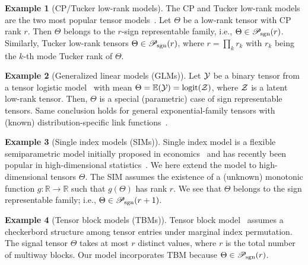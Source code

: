 \documentclass{article}
\theoremstyle{plain}
\theoremstyle{definition}
\newtheorem{example}{Example}
\def\caliP{\mathscr{P}_{\textup{sgn}}}
\begin{document}
\begin{example}[CP/Tucker low-rank models] The CP and Tucker low-rank models are the two most popular tensor models~\cite{anandkumar2014tensor,montanari2018spectral,kadmon2018statistical,cai2019nonconvex}. Let $\Theta$ be a low-rank tensor with CP rank $r$. Then $\Theta$ belongs to the $r$-sign representable family, i.e., $\Theta\in\caliP(r)$. Similarly, Tucker low-rank tensors $\Theta\in\caliP(r)$, where $r=\prod_kr_k$ with $r_k$ being the $k$-th mode Tucker rank of $\Theta$.  
\end{example} 

\begin{example}[Generalized linear models (GLMs)] Let $\mathcal{Y}$ be a binary tensor from a tensor logistic model~\cite{wang2018learning} with mean $\Theta=\mathbb{E}(\mathcal{Y})=\text{logit}(\mathcal{Z})$, where $\mathcal{Z}$ is a latent low-rank tensor. Then, $\Theta$ is a special (parametric) case of sign representable tensors. Same conclusion holds for general exponential-family tensors with (known) distribution-specific link functions~\cite{hong2020generalized}.
\end{example}

\begin{example}[Single index models (SIMs)] Single index model is a flexible semiparametric model initially proposed in economics~\cite{robinson1988root} and has recently been popular in high-dimensional statistics~\cite{balabdaoui2019least,ganti2017learning,alquier2013sparse}. We here extend the model to high-dimensional tensors $\Theta$. The SIM assumes the existence of a (unknown) monotonic function $g\colon \mathbb{R}\to \mathbb{R}$ such that $g(\Theta)$ has rank $r$. We see that $\Theta$ belongs to the sign representable family; i.e., $\Theta\in \caliP(r+1)$. 
\end{example}

\begin{example}[Tensor block models (TBMs)] Tensor block model~\cite{wang2019multiway,chi2020provable} assumes a checkerbord structure among tensor entries under marginal index permutation. The signal tensor $\Theta$ takes at most $r$ distinct values, where $r$ is the total number of multiway blocks. Our model incorporates TBM because $\Theta \in \caliP(r)$. 
\end{example}
\end{document}
